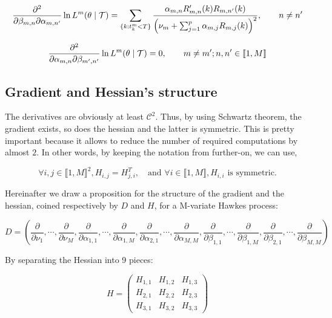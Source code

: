 \begin{equation}
\frac{\partial^2 } { \partial \beta_{m,n} \partial \alpha_{m,n'} } \ln L^m ( \theta \mid \mathcal{T} ) = \sum_{ \{k : t_k^m < T \} } \frac{ \alpha_{m,n} R'_{m,n} (k) R_{m,n'}(k) }{ \left ( \nu_m + \sum_{j=1}^p \alpha_{m,j} R_{m,j} (k) \right )^2 }, \qquad n \neq n'
\end{equation}

\begin{equation}
\frac{\partial^2 } {\partial \alpha_{m,n} \partial \beta_{m',n'} } \ln L^m ( \theta \mid \mathcal{T} ) = 0, \qquad m \neq m'; n,n' \in  \llbracket 1, M \rrbracket
\end{equation}



\subsection{Gradient and Hessian's structure}
The derivatives are obviously at least $\mathcal C^2$. Thus, by using Schwartz theorem, the gradient exists, so does the hessian and the latter is symmetric. This is pretty important because it allows to reduce the number of required computations by almost $2$. In other words, by keeping the notation from further-on, we can use, 

$$\forall i,j \in  \llbracket 1, M \rrbracket ^ 2,  H_{i,j} = H_{j,i}^T, \quad \text{and  } \forall i \in  \llbracket 1, M \rrbracket, H_{i,i} \text{ is symmetric.} $$


Hereinafter we draw a proposition for the structure of the gradient and the hessian, coined respectively by $D$ and $H$, for a M-variate Hawkes process:

\begin{equation}
D = \left ( 
\frac{\partial } {\partial \nu_1}, \cdots, \frac{\partial } {\partial \nu_M}
, 
\frac{\partial } {\partial \alpha_{1,1}},  \cdots, 
\frac{\partial } {\partial \alpha_{1,M}}, 
\frac{\partial } {\partial  \alpha_{2,1}}, \cdots, 
\frac{\partial } {\partial  \alpha_{M,M}}, 
\frac{\partial } {\partial  \beta_{1,1}}, \cdots, 
\frac{\partial } {\partial  \beta_{1,M}}, 
\frac{\partial } {\partial \beta_{2,1}}, \cdots, 
\frac{\partial } {\partial  \beta_{M,M}}  \right ) 
\end{equation}

By separating the Hessian into 9 pieces:

\begin{equation}
H = 
\begin{pmatrix}
H_{1,1} & H_{1,2}    & H_{1,3}  \\
H_{2,1}   &  H_{2,2}   & H_{2,3}\\
H_{3,1}      & H_{3,2}       &  H_{3,3}
\end{pmatrix}
\end{equation}


